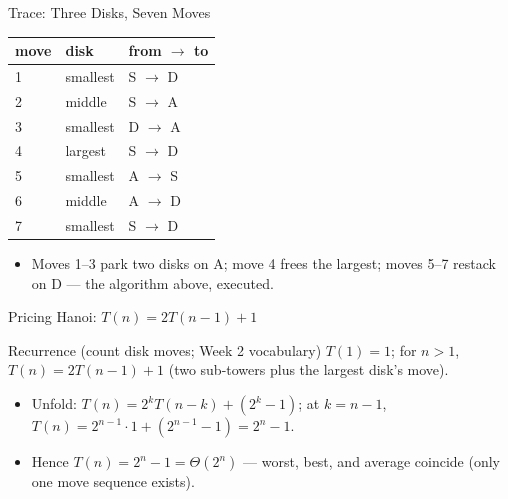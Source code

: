 \documentclass[aspectratio=169]{beamer}
\begin{document}
\begin{frame}{Trace: Three Disks, Seven Moves}
  \begin{center}
  {\small
  \begin{tabular}{lll}
    \toprule
    \textbf{move} & \textbf{disk} & \textbf{from $\to$ to} \\
    \midrule
    1 & smallest & S $\to$ D \\
    2 & middle & S $\to$ A \\
    3 & smallest & D $\to$ A \\
    4 & largest & S $\to$ D \\
    5 & smallest & A $\to$ S \\
    6 & middle & A $\to$ D \\
    7 & smallest & S $\to$ D \\
    \bottomrule
  \end{tabular}}
  \end{center}
  \begin{itemize}
    \item Moves 1--3 park two disks on A; move 4 frees the largest; moves
      5--7 restack on D --- the algorithm above, executed.
  \end{itemize}
\end{frame}

\begin{frame}{Pricing Hanoi: $T(n) = 2T(n-1) + 1$}
  \begin{block}{Recurrence (count disk moves; Week 2 vocabulary)}
    $T(1) = 1$; for $n > 1$, $T(n) = 2T(n-1) + 1$ (two sub-towers plus the
    largest disk's move).
  \end{block}
  \begin{itemize}
    \item Unfold: $T(n) = 2^{k}T(n-k) + (2^{k} - 1)$; at $k = n - 1$,
      $T(n) = 2^{n-1} \cdot 1 + (2^{n-1} - 1) = 2^{n} - 1$.
    \item Hence $T(n) = 2^{n} - 1 = \Theta(2^{n})$ --- worst, best, and
      average coincide (only one move sequence exists).
  \end{itemize}
\end{frame}
\end{document}
